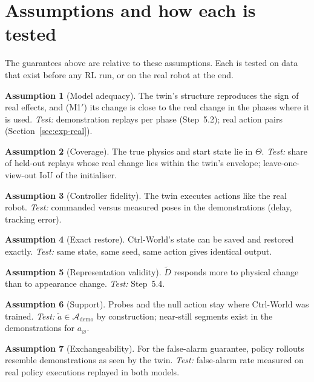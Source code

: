 \documentclass[11pt,a4paper]{article}
\theoremstyle{plain}
\theoremstyle{definition}
\newtheorem{assumption}{Assumption}
\theoremstyle{remark}
\newcommand{\Dt}{\tilde D}
\begin{document}
\section{Assumptions and how each is tested}\label{sec:assumptions}
The guarantees above are relative to these assumptions. Each is tested on data that exist before any RL run, or on the real robot at the end.
\begin{assumption}[Model adequacy]\label{as:adequacy}
The twin's structure reproduces the sign of real effects, and (M1$'$) its change is close to the real change in the phases where it is used. \emph{Test:} demonstration replays per phase (Step~5.2); real action pairs (Section~\ref{sec:exp-real}).
\end{assumption}
\begin{assumption}[Coverage]\label{as:coverage}
The true physics and start state lie in $\Theta$. \emph{Test:} share of held-out replays whose real change lies within the twin's envelope; leave-one-view-out IoU of the initialiser.
\end{assumption}
\begin{assumption}[Controller fidelity]\label{as:ctrl}
The twin executes actions like the real robot. \emph{Test:} commanded versus measured poses in the demonstrations (delay, tracking error).
\end{assumption}
\begin{assumption}[Exact restore]\label{as:restore}
Ctrl-World's state can be saved and restored exactly. \emph{Test:} same state, same seed, same action gives identical output.
\end{assumption}
\begin{assumption}[Representation validity]\label{as:rep}
$\Dt$ responds more to physical change than to appearance change. \emph{Test:} Step~5.4.
\end{assumption}
\begin{assumption}[Support]\label{as:support}
Probes and the null action stay where Ctrl-World was trained. \emph{Test:} $\tilde a\in\mathcal A_{\mathrm{demo}}$ by construction; near-still segments exist in the demonstrations for $a_\varnothing$.
\end{assumption}
\begin{assumption}[Exchangeability]\label{as:exch}
For the false-alarm guarantee, policy rollouts resemble demonstrations as seen by the twin. \emph{Test:} false-alarm rate measured on real policy executions replayed in both models.
\end{assumption}
\end{document}
